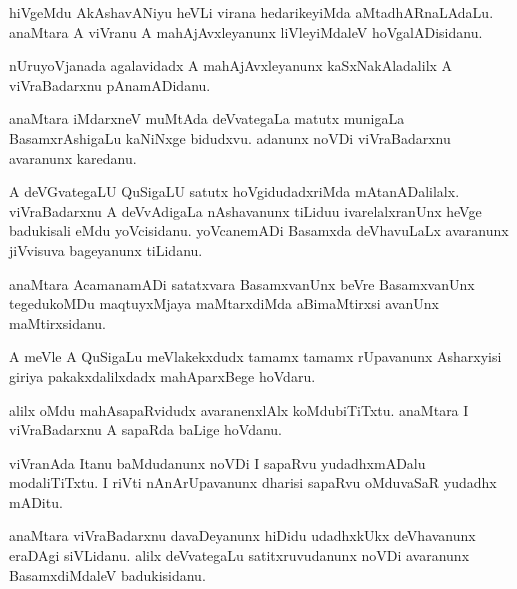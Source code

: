 \documentclass{article}
\begin{document}
\begin{mn}
hiVgeMdu  AkAshavANiyu  heVLi  virana  hedarikeyiMda  aMtadhARnaLAdaLu.  anaMtara  A  viVranu  A  mahAjAvxleyanunx  
liVleyiMdaleV  hoVgalADisidanu.
\end{mn}

\begin{mn}
nUruyoVjanada  agalavidadx  A  mahAjAvxleyanunx  kaSxNakAladalilx  A  viVraBadarxnu  pAnamADidanu. 
\end{mn}

\begin{mn}
anaMtara  iMdarxneV  muMtAda  deVvategaLa  matutx  munigaLa  BasamxrAshigaLu  kaNiNxge  bidudxvu.  
adanunx  noVDi  viVraBadarxnu  avaranunx  karedanu.
\end{mn}

\begin{mn}
A  deVGvategaLU  QuSigaLU  satutx hoVgidudadxriMda  mAtanADalilalx.  viVraBadarxnu  A  deVvAdigaLa  
nAshavanunx  tiLiduu  ivarelalxranUnx  heVge  badukisali  eMdu  yoVcisidanu.  yoVcanemADi  Basamxda  
deVhavuLaLx  avaranunx  jiVvisuva  bageyanunx  tiLidanu.
\end{mn}

\begin{mn}
anaMtara  AcamanamADi  satatxvara  BasamxvanUnx  beVre  BasamxvanUnx  tegedukoMDu  maqtuyxMjaya maMtarxdiMda  
aBimaMtirxsi  avanUnx  maMtirxsidanu.
\end{mn}

\begin{mn}
A  meVle  A  QuSigaLu  meVlakekxdudx  tamamx  tamamx  rUpavanunx  Asharxyisi  giriya  pakakxdalilxdadx  mahAparxBege  hoVdaru.
\end{mn}

\begin{mn}
alilx  oMdu  mahAsapaRvidudx  avaranenxlAlx  koMdubiTiTxtu.  anaMtara  I  viVraBadarxnu  A  sapaRda  baLige  hoVdanu.
\end{mn}

\begin{mn}
viVranAda  Itanu  baMdudanunx  noVDi  I  sapaRvu  yudadhxmADalu  modaliTiTxtu.  I  riVti  nAnArUpavanunx  
dharisi  sapaRvu  oMduvaSaR  yudadhx mADitu.
\end{mn}

\begin{mn}
anaMtara  viVraBadarxnu  davaDeyanunx  hiDidu  udadhxkUkx  deVhavanunx  eraDAgi  siVLidanu.  alilx  deVvategaLu   
satitxruvudanunx  noVDi  avaranunx  BasamxdiMdaleV  badukisidanu.
\end{mn}
\end{document}
